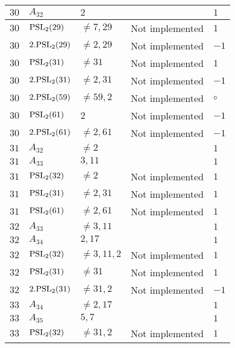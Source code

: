 \documentclass[a4paper, 11pt]{article}
\begin{document}
\begin{longtable}{lllll}
        $ 30 $ & $ A_{32} $ & $ 2 $ & $ ~ $ & $ 1  $ \\ \hline
        $ 30 $ & $ {\rm PSL}_{2}(29) $ & $ \neq 7, 29 $ & Not implemented & $ 1  $ \\ \hline
        $ 30 $ & $ 2.{\rm PSL}_{2}(29) $ & $ \neq 2, 29 $ & Not implemented & $ -1  $ \\ \hline
        $ 30 $ & $ {\rm PSL}_{2}(31) $ & $ \neq 31 $ & Not implemented & $ 1  $ \\ \hline
        $ 30 $ & $ 2.{\rm PSL}_{2}(31) $ & $ \neq 2, 31 $ & Not implemented & $ -1  $ \\ \hline
        $ 30 $ & $ 2.{\rm PSL}_{2}(59) $ & $ \neq 59, 2 $ & Not implemented & $\circ$ \\ \hline
        $ 30 $ & $ {\rm PSL}_{2}(61) $ & $ 2 $ & Not implemented & $ -1  $ \\ \hline
        $ 30 $ & $ 2.{\rm PSL}_{2}(61) $ & $ \neq 2, 61 $ & Not implemented & $ -1  $ \\ \hline
        $ 31 $ & $ A_{32} $ & $ \neq 2 $ & $ ~ $ & $ 1  $ \\ \hline
        $ 31 $ & $ A_{33} $ & $ 3, 11 $ & $ ~ $ & $ 1  $ \\ \hline
        $ 31 $ & $ {\rm PSL}_{2}(32) $ & $ \neq 2 $ & Not implemented & $ 1  $ \\ \hline
        $ 31 $ & $ {\rm PSL}_{2}(31) $ & $ \neq 2, 31 $ & Not implemented & $ 1  $ \\ \hline
        $ 31 $ & $ {\rm PSL}_{2}(61) $ & $ \neq 2, 61 $ & Not implemented & $ 1  $ \\ \hline
        $ 32 $ & $ A_{33} $ & $ \neq 3, 11 $ & $ ~ $ & $ 1  $ \\ \hline
        $ 32 $ & $ A_{34} $ & $ 2, 17 $ & $ ~ $ & $ 1  $ \\ \hline
        $ 32 $ & $ {\rm PSL}_{2}(32) $ & $ \neq 3, 11, 2 $ & Not implemented & $ 1  $ \\ \hline
        $ 32 $ & $ {\rm PSL}_{2}(31) $ & $ \neq 31 $ & Not implemented & $ 1  $ \\ \hline
        $ 32 $ & $ 2.{\rm PSL}_{2}(31) $ & $ \neq 31, 2 $ & Not implemented & $ -1  $ \\ \hline
        $ 33 $ & $ A_{34} $ & $ \neq 2, 17 $ & $ ~ $ & $ 1  $ \\ \hline
        $ 33 $ & $ A_{35} $ & $ 5, 7 $ & $ ~ $ & $ 1  $ \\ \hline
        $ 33 $ & $ {\rm PSL}_{2}(32) $ & $ \neq 31, 2 $ & Not implemented & $ 1  $ \\ \hline

\end{longtable}
\end{document}
